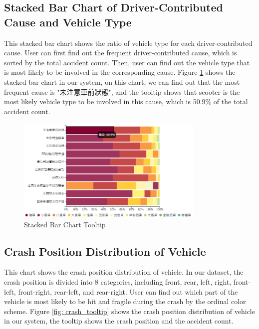 \documentclass[a4paper, oneside, final, 12pt]{scrartcl} %
\begin{document}
\subsection{Stacked Bar Chart of Driver-Contributed Cause and Vehicle Type}

This stacked bar chart shows the ratio of vehicle type for each driver-contributed cause.
User can first find out the frequent driver-contributed cause,
which is sorted by the total accident count.
Then, user can find out the vehicle type that is 
most likely to be involved in the corresponding cause.
Figure \ref{fig: stacked_tooltip} shows the stacked bar chart in our system,
on this chart, we can find out that the most frequent cause is
"未注意車前狀態", and the tooltip shows that scooter is the most likely vehicle type
to be involved in this cause, which is 50.9\% of the total accident count.

\begin{figure}[htbp]
  \centering
  \includegraphics[width=0.8\textwidth]{"./Image/stacked_tooltip.png"}
  \caption{Stacked Bar Chart Tooltip}
  \label{fig: stacked_tooltip}
\end{figure}

\subsection{Crash Position Distribution of Vehicle}

This chart shows the crash position distribution of vehicle.
In our dataset, the crash position is divided into 8 categories,
including front, rear, left, right, front-left, front-right, rear-left, and rear-right.
User can find out which part of the vehicle is most likely to be hit
and fragile during the crash by the ordinal color scheme.
Figure \ref{fig: crash_tooltip} shows the crash position distribution of vehicle in our system,
the tooltip shows the crash position and the accident count.
\end{document}

